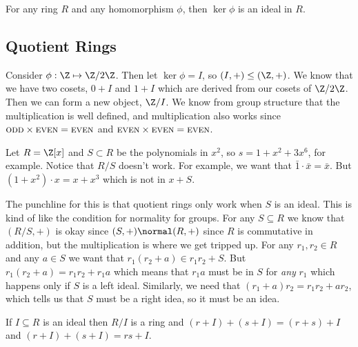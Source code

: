 \begin{example}
For any ring $R$ and any homomorphism $\phi$, then $\ker \phi$ is an ideal in $R$.
\end{example}

\subsection{Quotient Rings}

Consider $\phi : \Z \mapsto \Z/2\Z$. Then let $\ker\phi = I$, so $(I,+) \leq (\Z,+)$. We know that we have two cosets, $0 + I$ and $1 + I$ which are derived from our cosets of $\Z/2\Z$. Then we can form a new object, $\Z/I$. We know from group structure that the multiplication is well defined, and multiplication also works since $\textsc{odd} \times \textsc{even} = \textsc{even}$ and $\textsc{even} \times \textsc{even} = \textsc{even}$.

\begin{example}
Let $R = \Z[x]$ and $S \subset R$ be the polynomials in $x^2$, so $s = 1 + x^2 + 3x^6$, for example. Notice that $R/S$ doesn't work. For example, we want that $\bar{1} \cdot \bar{x} = \bar{x}$. But $(1 + x^2) \cdot x = x + x^3$ which is not in $x + S$.
\end{example}

The punchline for this is that quotient rings only work when $S$ is an ideal. This is kind of like the condition for normality for groups. For any $S \subseteq R$ we know that $(R/S,+)$ is okay since $(S,+) \normal (R,+)$ since $R$ is commutative in addition, but the multiplication is where we get tripped up. For any $r_1,r_2 \in R$ and any $a \in S$ we want that $r_1(r_2 + a) \in r_1r_2 + S$. But $r_1(r_2 + a) = r_1r_2 + r_1a$ which means that $r_1a$ must be in $S$ for \emph{any} $r_1$ which happens only if $S$ is a left  ideal. Similarly, we need that $(r_1 + a)r_2 = r_1r_2 + ar_2$, which tells us that $S$ must be a right idea, so it must be an idea.

\begin{proposition}
If $I \subseteq R$ is an ideal then $R/I$ is a ring and $(r + I) + (s + I) = (r+s) + I$ and $(r+I) + (s + I) = rs + I$.
\end{proposition}

\begin{example}
\end{example}


